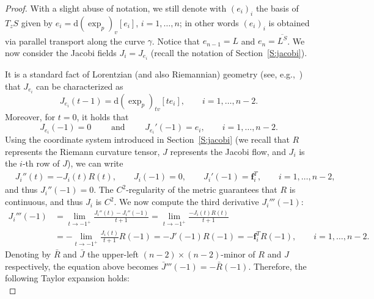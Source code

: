 \documentclass[12pt,a4paper]{amsart}
\theoremstyle{plain}
\theoremstyle{definition}
\numberwithin{equation}{section}
\newcommand{\de}{{\mathrm{d}}}
\begin{document}
\begin{proof}
  With a slight abuse of notation, we still denote with $(e_i)_i$ the
  basis of $T_zS$ given by
  $e_i=\de(\exp_p)_v[e_i]$, $i=1,\dots, n$;
  in other words $(e_i)_i$  is obtained via parallel
  transport along the curve $\gamma$.
  Notice that $e_{n-1}=L$ and $e_n=\overline{L^S}$.
  We now consider the Jacobi fields $J_i=J_{e_i}$ (recall the notation
  of Section~\ref{S:jacobi}).

It is a standard fact of Lorentzian (and also Riemannian) geometry
  (see, e.g.,~\cite[Sec.~3.C.3]{GallotHulinLafontaine04}) that $J_{e_i}$ can be
  characterized as 
  \begin{equation}\label{eq:JacExp}
    J_{e_i}(t-1)     =
    \de (\exp_p)_{tv}[te_i]
    ,
    \qquad
    i=1,\dots, n-2
    .
  \end{equation}
  Moreover, for $t=0$, it holds that
  \begin{equation}\label{eq:JIC}
    J_{e_i}(-1) =0
    \qquad
    \text{ and }
    \qquad
   J_{e_i}'(-1) =e_i
    ,
    \qquad
    i=1,\dots, n-2
    .
  \end{equation}
  Using the coordinate system introduced in Section~\ref{S:jacobi} (we
  recall that $R$ represents the Riemann curvature tensor, $J$
  represents the Jacobi flow, and $J_i$ is the $i$-th row of $J$), we
  can write
  \begin{align*}
    &
      J_i''(t)=-J_i(t)R(t)
      ,
      \qquad
      J_i(-1)=0
      ,
      \qquad
      J_i'(-1)
      =\mathbf{f}_i^T
      ,
      \qquad
      i=1,\dots,n-2
      ,
  \end{align*}
  and thus $J_i''(-1)=0$.
  The $C^2$-regularity of the metric guarantees that $R$ is
  continuous, and thus $J_i$ is $C^2$.
  We now compute the third derivative $J_i'''(-1)$:
  \begin{align*}
    J_i'''(-1)
    &
      =
      \lim_{t\to -1^+}
      \frac{J_i''(t)-J_i''(-1)}{t+1}
      =
      \lim_{t\to -1^+}
      \frac{-J_i(t)R(t)}{t+1}
    \\
    &
      =
      -
      \lim_{t\to -1^+}
      \frac{J_i(t)}{t+1}
      R(-1)
      =
      -
      J'(-1)
      R(-1)
      =
      -\mathbf{f}_i^T
      R(-1)
      ,
      \qquad
      i=1,\dots,n-2
      .
  \end{align*}
  Denoting by $\bar R$ and $\bar J$ the upper-left
  $(n-2)\times(n-2)$-minor of $R$ and $J$ respectively, the equation
  above becomes $\bar J'''(-1)=-\bar R(-1)$. Therefore, the
  following Taylor expansion holds:
  \begin{equation*}

\end{equation*}
\end{proof}
\end{document}
